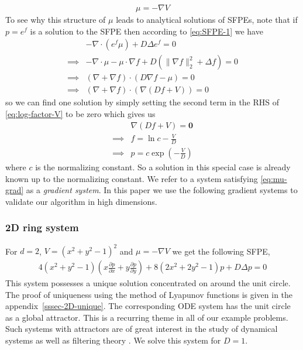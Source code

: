 \begin{align}
    \mu = -\nabla V\label{eq:mu-grad}
\end{align}
To see why this structure of $\mu$ leads to analytical solutions of SFPEs, note that if $p=e^f$ is a solution to the SFPE then according to \eqref{eq:SFPE-1} we have 
\begin{align}
    &\mathcal -\nabla\cdot(e^f\mu) + D\Delta e^f =0\\
    \implies&  -\nabla\cdot \mu - \mu \cdot \nabla f + D\left(\|\nabla f\|_2^2 + \Delta f\right) =0 \label{eq:log-transform-0}\\
    \implies&(\nabla + \nabla f)\cdot(D\nabla f -\mu) =0\label{eq:log-factor}\\
    \implies&(\nabla + \nabla f)\cdot(\nabla (Df + V)) =0\label{eq:log-factor-V}    
\end{align}
so we can find one solution by simply setting the second term in the RHS of \eqref{eq:log-factor-V} to be zero which gives us
\begin{align}
    &\nabla(Df + V) = \mathbf 0\\
    \implies& f =\ln c-\frac{V}{D}\\
    \implies& p= c\exp\left(-\frac{V}{D}\right)\label{eq:grad-sol}
\end{align}
where $c$ is the normalizing constant. So a solution in this special case is already known up to the normalizing constant. We refer to a system satisfying \eqref{eq:mu-grad} as a \textit{gradient system}.
In this paper we use the following gradient systems to validate our algorithm in high dimensions. 

\subsubsection{2D ring system}
For $d=2$, $V=(x^2+y^2-1)^2$ and $\mu=-\nabla V$ we get the following SFPE,
\begin{align}
     4(x^2+y^2-1)\left(x\frac{\partial p}{\partial x}+y\frac{\partial p}{\partial y}\right) + 8(2x^2+2y^2-1)p + D\Delta p=0 \label{eq:ring2D}
\end{align}
This system possesses a unique solution concentrated on around the unit circle. The proof of uniqueness using the method of Lyapunov functions is given in the appendix~\ref{sssec-2D-unique}. The corresponding ODE system has the unit circle as a global attractor. This is a recurring theme in all of our example problems. Such systems with attractors are of great interest in the study of dynamical systems \cite{ott1981strange} as well as filtering theory \cite{kontorovich2009non}. We solve this system for $D=1$.

